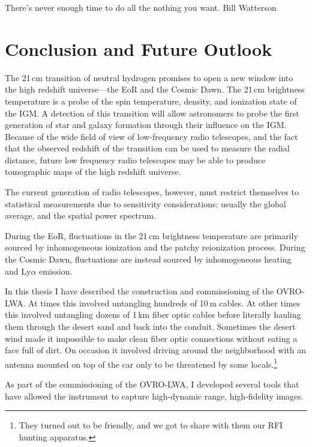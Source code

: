 \cleartoevenpage

\myepigraph
{There's never enough time to do all the nothing you want.}
{Bill Watterson}

\chapter{Conclusion and Future Outlook}
\label{chapter5}

\begin{bibunit}

The 21\,cm transition of neutral hydrogen promises to open a new window into the high redshift
universe---the EoR and the Cosmic Dawn. The 21\,cm brightness temperature is a probe of the spin
temperature, density, and ionization state of the IGM.  A detection of this transition will allow
astronomers to probe the first generation of star and galaxy formation through their influence on
the IGM. Because of the wide field of view of low-frequency radio telescopes, and the fact that the
observed redshift of the transition can be used to measure the radial distance, future low frequency
radio telescopes may be able to produce tomographic maps of the high redshift universe.

The current generation of radio telescopes, however, must restrict themselves to statistical
measurements due to sensitivity considerations: usually the global average, and the spatial power
spectrum.

During the EoR, fluctuations in the 21\,cm brightness
temperature are primarily sourced by inhomogeneous ionization and the patchy reionization process.
During the Cosmic Dawn, fluctuations are instead sourced by inhomogeneous heating and Ly$\alpha$
emission.

In this thesis I have described the construction and commissioning of the OVRO-LWA.  At times this
involved untangling hundreds of 10\,m cables. At other times this involved untangling dozens of
1\,km fiber optic cables before literally hauling them through the desert sand and back into the
conduit.  Sometimes the desert wind made it impossible to make clean fiber optic connections without
eating a face full of dirt. On occasion it involved driving around the neighborhood with an
antenna mounted on top of the car only to be threatened by some locals.\footnote{
    They turned out to be friendly, and we got to share with them our RFI hunting apparatus.
}

As part of the commissioning of the OVRO-LWA, I developed several tools that have allowed the
instrument to capture high-dynamic range, high-fidelity images.


\end{bibunit}
